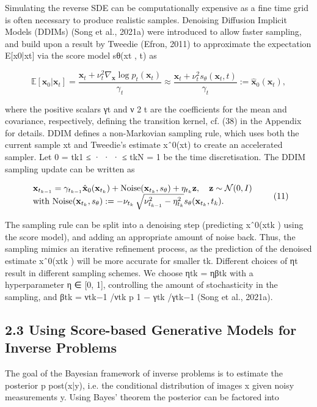 \documentclass{article}
\begin{document}
Simulating the reverse SDE can be computationally expensive as a fine time grid is often necessary to produce realistic samples. Denoising Diffusion Implicit Models (DDIMs) (Song et al., 2021a) were introduced to allow faster sampling, and build upon a result by Tweedie (Efron, 2011) to approximate the expectation E[x0|xt] via the score model sθ(xt , t) as

$$\mathbb{E}[\mathbf{x}_{0}|\mathbf{x}_{t}]=\frac{\mathbf{x}_{t}+\nu_{t}^{2}\nabla_{\mathbf{x}}\log p_{t}(\mathbf{x}_{t})}{\gamma_{t}}\approx\frac{\mathbf{x}_{t}+\nu_{t}^{2}s_{\theta}(\mathbf{x}_{t},t)}{\gamma_{t}}:=\hat{\mathbf{x}}_{0}(\mathbf{x}_{t}),\tag{10}$$

where the positive scalars γt and ν 2 t are the coefficients for the mean and covariance, respectively, defining the transition kernel, cf. (38) in the Appendix for details. DDIM defines a non-Markovian sampling rule, which uses both the current sample xt and Tweedie's estimate xˆ0(xt) to create an accelerated sampler. Let 0 = tk1 ≤ · · · ≤ tkN = 1 be the time discretisation. The DDIM sampling update can be written as

$$\begin{array}{l}{\bf x}_{t_{k-1}}=\gamma_{t_{k-1}}\hat{\bf x}_{0}({\bf x}_{t_{k}})+{\rm Noise}({\bf x}_{t_{k}},s_{\theta})+\eta_{t_{k}}{\bf z},\quad{\bf z}\sim{\cal N}(0,I)\\ \mbox{with Noise}({\bf x}_{t_{k}},s_{\theta}):=-\nu_{t_{k}}\,\sqrt{\nu_{t_{k-1}}^{2}-\eta_{t_{k}}^{2}}s_{\theta}({\bf x}_{t_{k}},t_{k}).\end{array}\tag{11}$$

The sampling rule can be split into a denoising step (predicting xˆ0(xtk ) using the score model), and adding an appropriate amount of noise back. Thus, the sampling mimics an iterative refinement process, as the prediction of the denoised estimate xˆ0(xtk ) will be more accurate for smaller tk. Different choices of ηt result in different sampling schemes. We choose ηtk = ηβtk with a hyperparameter η ∈ [0, 1], controlling the amount of stochasticity in the sampling, and βtk = νtk−1 /νtk p 1 − γtk /γtk−1 (Song et al., 2021a).

\subsection{2.3 Using Score-based Generative Models for Inverse Problems}

The goal of the Bayesian framework of inverse problems is to estimate the posterior p post(x|y), i.e. the conditional distribution of images x given noisy measurements y. Using Bayes' theorem the posterior can be factored into
\end{document}
